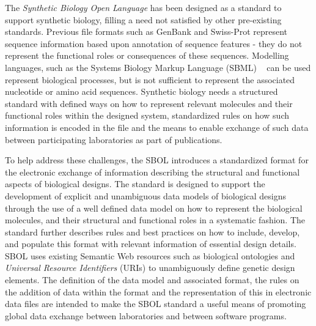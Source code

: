 The \emph{Synthetic Biology Open Language} has been designed as a standard to support synthetic biology, filling a need not satisfied by other pre-existing standards. Previous file formats such as GenBank and Swiss-Prot represent sequence information based upon annotation of sequence features - they do not represent the functional roles or consequences of these sequences. Modelling languages, such as the Systems Biology Markup Language (SBML) ~\cite{SBML} can be used represent biological processes, but is not sufficient to represent the associated nucleotide or amino acid sequences.  %
Synthetic biology needs a structured standard with defined ways on how to represent relevant molecules and their functional roles within the designed system, standardized rules on how such information is encoded in the file and the means to enable exchange of such data between participating laboratories as part of publications. 

To help address these challenges, the SBOL introduces a standardized format for the electronic exchange of information describing the structural and functional aspects of biological designs. 
The standard is designed to support the development of explicit and unambiguous data models of biological designs through the use of a well defined data model on how to represent the biological molecules, and their structural and functional roles in a systematic fashion. 
The standard further describes rules and best practices on how to include, develop, and populate this format with relevant information of essential design details. 
SBOL uses existing Semantic Web resources such as biological ontologies and \emph{Universal Resource Identifiers} (URIs) to unambiguously define genetic design elements.
The definition of the data model and associated format, the rules on the addition of data within the format and the representation of this in electronic data files are intended to make the SBOL standard a useful means of promoting global data exchange between laboratories and between software programs.

